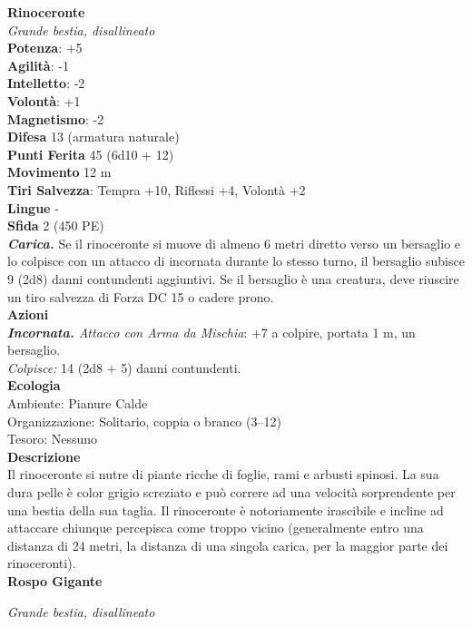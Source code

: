 \begin{multicols}{2}
\medskip\textbf{Rinoceronte}\\
\emph{Grande bestia, disallineato}\\
\textbf{Potenza}: +5\\
\textbf{Agilità}: -1\\
\textbf{Intelletto}: -2\\
\textbf{Volontà}: +1\\
\textbf{Magnetismo}: -2\\
\textbf{Difesa} 13 (armatura naturale)\\
\textbf{Punti Ferita} 45 (6d10 + 12)\\
\textbf{Movimento} 12 m\\
\textbf{Tiri Salvezza}: Tempra +10, Riflessi +4, Volontà +2\\
\textbf{Lingue} -\\
\textbf{Sfida} 2 (450 PE)\smallskip\\
\emph{\textbf{Carica.}} Se il rinoceronte si muove di almeno 6 metri diretto verso un bersaglio e lo colpisce con un attacco di incornata durante lo stesso turno, il bersaglio subisce 9 (2d8) danni contundenti aggiuntivi. Se il bersaglio è una creatura, deve riuscire un tiro salvezza di Forza DC 15 o cadere prono.\\
\smallskip\textbf{Azioni}\\
\emph{\textbf{Incornata.} Attacco con Arma da Mischia}: +7 a colpire, portata 1 m, un bersaglio.\\
\emph{Colpisce:} 14 (2d8 + 5) danni contundenti.\\
\textbf{Ecologia}\\
Ambiente: Pianure Calde\\
Organizzazione: Solitario, coppia o branco (3–12)\\
Tesoro: Nessuno\\
\textbf{Descrizione}\\

Il rinoceronte si nutre di piante ricche di foglie, rami e arbusti spinosi. La sua dura pelle è color grigio screziato e può correre ad una velocità sorprendente per una bestia della sua taglia. Il rinoceronte è notoriamente irascibile e incline ad attaccare chiunque percepisca come troppo vicino (generalmente entro una distanza di 24 metri, la distanza di una singola carica, per la maggior parte dei rinoceronti). \\

\textbf{Rospo Gigante}

\emph{Grande bestia, disallineato}


\end{multicols}
